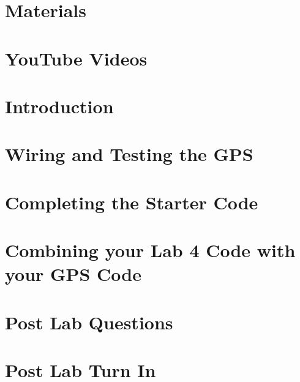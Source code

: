 \documentclass[12pt]{article}
\begin{document}
  \maketitle

  \thispagestyle{fancy}

  \section*{Materials}
  

  \section*{YouTube Videos}
  

  \section*{Introduction}
  

  \section{Wiring and Testing the GPS}
  

  \section{Completing the Starter Code}
  	

  \section{Combining your Lab 4 Code with your GPS Code}
  

  \newpage

  \section*{Post Lab Questions}
  

  \section*{Post Lab Turn In}
  
\end{document}
